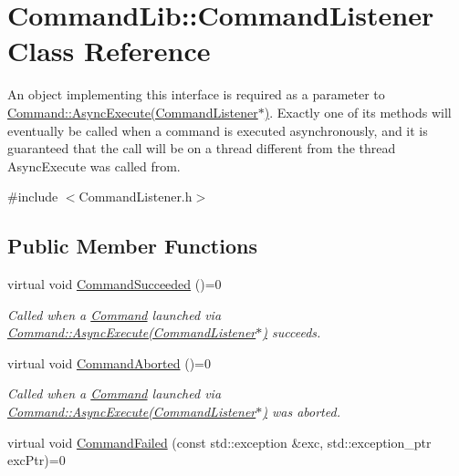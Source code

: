 \hypertarget{class_command_lib_1_1_command_listener}{}\section{Command\+Lib\+:\+:Command\+Listener Class Reference}
\label{class_command_lib_1_1_command_listener}


An object implementing this interface is required as a parameter to \mbox{\hyperlink{class_command_lib_1_1_command_a44bad231a0f0a6de3d5405382d95f800}{Command\+::\+Async\+Execute(\+Command\+Listener$\ast$)}}. Exactly one of its methods will eventually be called when a command is executed asynchronously, and it is guaranteed that the call will be on a thread different from the thread Async\+Execute was called from.  




{\ttfamily \#include $<$Command\+Listener.\+h$>$}

\subsection*{Public Member Functions}
\begin{DoxyCompactItemize}
\item 
virtual void \mbox{\hyperlink{class_command_lib_1_1_command_listener_a42f73f4eb4582aa82a0bd1d57151ef73}{Command\+Succeeded}} ()=0
\begin{DoxyCompactList}\small\item\em Called when a \mbox{\hyperlink{class_command_lib_1_1_command}{Command}} launched via \mbox{\hyperlink{class_command_lib_1_1_command_a44bad231a0f0a6de3d5405382d95f800}{Command\+::\+Async\+Execute(\+Command\+Listener$\ast$)}} succeeds. \end{DoxyCompactList}\item 
virtual void \mbox{\hyperlink{class_command_lib_1_1_command_listener_aa389ff6dd3895ce4ecc9447a23e4d9fc}{Command\+Aborted}} ()=0
\begin{DoxyCompactList}\small\item\em Called when a \mbox{\hyperlink{class_command_lib_1_1_command}{Command}} launched via \mbox{\hyperlink{class_command_lib_1_1_command_a44bad231a0f0a6de3d5405382d95f800}{Command\+::\+Async\+Execute(\+Command\+Listener$\ast$)}} was aborted. \end{DoxyCompactList}\item 
virtual void \mbox{\hyperlink{class_command_lib_1_1_command_listener_ae53f9a18ffd79b79754dfdcfb84b138e}{Command\+Failed}} (const std\+::exception \&exc, std\+::exception\+\_\+ptr exc\+Ptr)=0
\end{DoxyCompactItemize}


